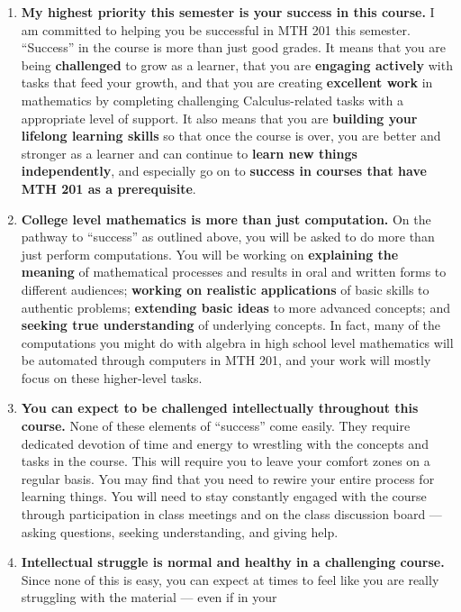 \documentclass[]{article}
\providecommand{\tightlist}{%
  \setlength{\itemsep}{0pt}\setlength{\parskip}{0pt}}
\begin{document}
\begin{enumerate}
\def\labelenumi{\arabic{enumi}.}
\tightlist
\item
  \textbf{My highest priority this semester is your success in this
  course.} I am committed to helping you be successful in MTH 201 this
  semester. ``Success'' in the course is more than just good grades. It
  means that you are being \textbf{challenged} to grow as a learner,
  that you are \textbf{engaging actively} with tasks that feed your
  growth, and that you are creating \textbf{excellent work} in
  mathematics by completing challenging Calculus-related tasks with a
  appropriate level of support. It also means that you are
  \textbf{building your lifelong learning skills} so that once the
  course is over, you are better and stronger as a learner and can
  continue to \textbf{learn new things independently}, and especially go
  on to \textbf{success in courses that have MTH 201 as a prerequisite}.
\item
  \textbf{College level mathematics is more than just computation.} On
  the pathway to ``success'' as outlined above, you will be asked to do
  more than just perform computations. You will be working on
  \textbf{explaining the meaning} of mathematical processes and results
  in oral and written forms to different audiences; \textbf{working on
  realistic applications} of basic skills to authentic problems;
  \textbf{extending basic ideas} to more advanced concepts; and
  \textbf{seeking true understanding} of underlying concepts. In fact,
  many of the computations you might do with algebra in high school
  level mathematics will be automated through computers in MTH 201, and
  your work will mostly focus on these higher-level tasks.
\item
  \textbf{You can expect to be challenged intellectually throughout this
  course.} None of these elements of ``success'' come easily. They
  require dedicated devotion of time and energy to wrestling with the
  concepts and tasks in the course. This will require you to leave your
  comfort zones on a regular basis. You may find that you need to rewire
  your entire process for learning things. You will need to stay
  constantly engaged with the course through participation in class
  meetings and on the class discussion board --- asking questions,
  seeking understanding, and giving help.
\item
  \textbf{Intellectual struggle is normal and healthy in a challenging
  course.} Since none of this is easy, you can expect at times to feel
  like you are really struggling with the material --- even if in your

\end{enumerate}
\end{document}
